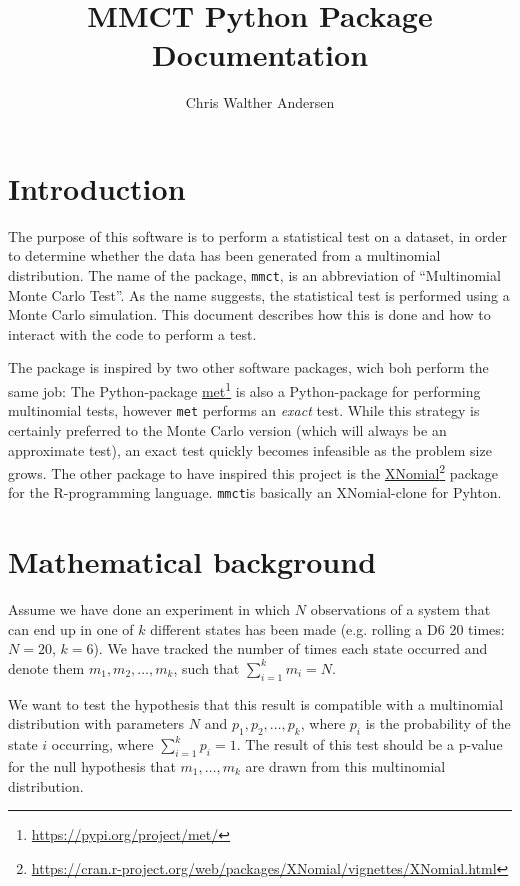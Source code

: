 \documentclass{ol-softwaremanual}
\title{MMCT Python Package \\ Documentation}
\author{Chris Walther Andersen}
\newcommand{\doclink}[2]{\href{#1}{#2}\footnote{\url{#1}}}
\newcommand{\mmct}{\texttt{mmct}}
\begin{document}
\maketitle

\tableofcontents
\listoflistings
\newpage

\section{Introduction}

The purpose of this software is to perform a statistical test on a dataset, in 
order to determine whether the data has been generated from a multinomial 
distribution. The name of the package, \mmct, is an abbreviation of 
\enquote{Multinomial Monte Carlo Test}. As the name suggests, the statistical 
test is performed using a Monte Carlo simulation. This document describes how 
this is done and how to interact with the code to perform a test.

The package is inspired by two other software packages, wich boh perform the 
same job:
The Python-package \doclink{https://pypi.org/project/met/}{met} is also a 
Python-package for performing multinomial tests, however \texttt{met} performs 
an \emph{exact} test. While this strategy is certainly preferred to the Monte 
Carlo version (which will always be an approximate test), an exact test quickly 
becomes infeasible as the problem size grows. The other package to have 
inspired this project is the 
\doclink{https://cran.r-project.org/web/packages/XNomial/vignettes/XNomial.html}{XNomial}
package for the R-programming language. \mmct is basically an XNomial-clone for 
Pyhton.



\section{Mathematical background}

Assume we have done an experiment in which $N$ observations of a system that 
can end up in one of $k$ different states has been made (e.g. rolling a D6 20 
times: $N=20$, $k=6$). We have tracked the number of times each state occurred 
and denote them $m_1, m_2, \ldots, m_k$, such that $\sum_{i=1}^k m_i = N$.

We want to test the hypothesis that this result is compatible with a 
multinomial distribution with parameters $N$ and $p_1, p_2, \ldots, p_k$, where 
$p_i$ is the probability of the state $i$ occurring, where $\sum_{i=1}^k p_i = 
1$. The result of this test should be a p-value for the null hypothesis that 
$m_1, \ldots, m_k$ are drawn from this multinomial distribution.
\end{document}
